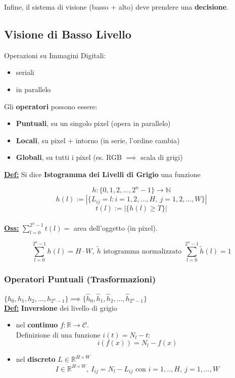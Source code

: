 \documentclass[a4paper,12pt]{article}
\newcommand{\definizione}{\noindent\textbf{\underline{Def:}} }
\newcommand{\osservazione}{\noindent\textbf{\underline{Oss:}} }
\begin{document}
	Infine, il sistema di visione (basso + alto) deve prendere una \textbf{decisione}.

	\subsection{Visione di Basso Livello}

	Operazioni su Immagini Digitali:
	\begin{itemize}
		\item seriali
		\item in parallelo
	\end{itemize}

	\noindent Gli \textbf{operatori} possono essere:
	\begin{itemize}
		\item \textbf{Puntuali}, su un singolo pixel (opera in parallelo)
		\item \textbf{Locali}, su pixel + intorno (in serie, l'ordine cambia)
		\item \textbf{Globali}, su tutti i pixel (es. RGB $\implies$ scala di grigi)
	\end{itemize}

	\definizione Si dice \textbf{Istogramma dei Livelli di Grigio} una funzione

	\[
	h : \{ 0,1,2, ..., 2^n - 1\} \rightarrow \mathbb{N}
	\]
	\[
	h(l) := | \{ L_{ij} = l : i = 1,2,...,H, \ j= 1,2,...,W  \} |
	\]
	\[
	t(l) := | \{ h(l) \geq T \}|
	\] \\

	\osservazione $ \sum_{l = 0}^{2^n - 1} t(l) = $ area dell'oggetto (in pixel).

	\[
	\sum_{l = 0}^{2^n - 1} h(l) = H \cdot W, \ \tilde{h} \text{ istogramma normalizzato } \sum_{l = 0}^{2^n - 1} \tilde{h}(l) = 1
	\]

	\subsubsection{Operatori Puntuali (Trasformazioni)}

	$\{ h_0, h_1, h_2, ..., h_{2^n - 1}\} \implies \{ \hat{h}_0, \hat{h}_1, \hat{h}_2, ..., \hat{h}_{2^n - 1} \}$ \\

	\definizione \textbf{Inversione} dei livello di grigio

	\begin{itemize}
		\item nel \textbf{continuo} $ f : \mathbb{R} \rightarrow \mathcal{C}$. \\
		Definizione di una funzione $i(t) = N_l - t$:
		\[
		i(f(x)) = N_l - f(x)
		\]
		\item nel \textbf{discreto} $ L \in \mathbb{R}^{H \times W}$
		\[
		I \in \mathbb{R}^{H \times W}, \ I_{ij} = N_l - L_{ij} \text{ con } i = 1,..,H, \ j = 1,...,W
		\]
	\end{itemize}
\end{document}
